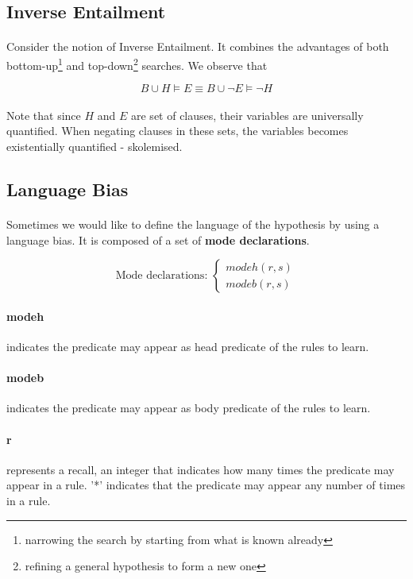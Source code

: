 \documentclass{article}
\theoremstyle{plain}
\theoremstyle{definition}
\begin{document}
\begin{multicols}{2}
\subsection{Inverse Entailment}

\paragraph{} Consider the notion of Inverse Entailment. It combines the advantages of both bottom-up\footnote{narrowing the search by starting from what is known already} and top-down\footnote{refining a general hypothesis to form a new one} searches. We observe that

\[ B \cup H \models E \equiv B \cup \lnot E \models \lnot H \]

\paragraph{} Note that since $H$ and $E$ are set of clauses, their variables are universally quantified. When negating clauses in these sets, the variables becomes existentially quantified - skolemised. 

\subsection{Language Bias}\label{sec:LanguageBias}

\paragraph{} Sometimes we would like to define the language of the hypothesis by using a language bias. It is composed of a set of \textbf{mode declarations}.

\[
\text{Mode declarations: }
\begin{cases}
	modeh(r, s)\\
	modeb(r, s)
\end{cases}
\]

\paragraph{modeh} indicates the predicate may appear as head predicate of the rules to learn.
\paragraph{modeb} indicates the predicate may appear as body predicate of the rules to learn.
\paragraph{r} represents a recall, an integer that indicates how many times the predicate may appear in a rule. '*' indicates that the predicate may appear any number of times in a rule.

\end{multicols}
\end{document}
